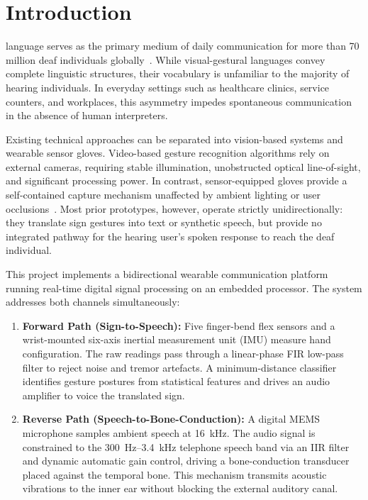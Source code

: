 \documentclass[conference]{IEEEtran}
\begin{document}
\section{Introduction}
\label{sec:intro}

 language serves as the primary medium of daily communication for more than 70 million deaf individuals globally~\cite{who2021}. While visual-gestural languages convey complete linguistic structures, their vocabulary is unfamiliar to the majority of hearing individuals. In everyday settings such as healthcare clinics, service counters, and workplaces, this asymmetry impedes spontaneous communication in the absence of human interpreters.

Existing technical approaches can be separated into vision-based systems and wearable sensor gloves. Video-based gesture recognition algorithms rely on external cameras, requiring stable illumination, unobstructed optical line-of-sight, and significant processing power. In contrast, sensor-equipped gloves provide a self-contained capture mechanism unaffected by ambient lighting or user occlusions~\cite{mehdi2002}. Most prior prototypes, however, operate strictly unidirectionally: they translate sign gestures into text or synthetic speech, but provide no integrated pathway for the hearing user's spoken response to reach the deaf individual.

This project implements a bidirectional wearable communication platform running real-time digital signal processing on an embedded processor. The system addresses both channels simultaneously:
\begin{enumerate}
  \item \textbf{Forward Path (Sign-to-Speech):} Five finger-bend flex sensors and a wrist-mounted six-axis inertial measurement unit (IMU) measure hand configuration. The raw readings pass through a linear-phase FIR low-pass filter to reject noise and tremor artefacts. A minimum-distance classifier identifies gesture postures from statistical features and drives an audio amplifier to voice the translated sign.
  \item \textbf{Reverse Path (Speech-to-Bone-Conduction):} A digital MEMS microphone samples ambient speech at 16~kHz. The audio signal is constrained to the 300~Hz--3.4~kHz telephone speech band via an IIR filter and dynamic automatic gain control, driving a bone-conduction transducer placed against the temporal bone. This mechanism transmits acoustic vibrations to the inner ear without blocking the external auditory canal.
\end{enumerate}
\end{document}
